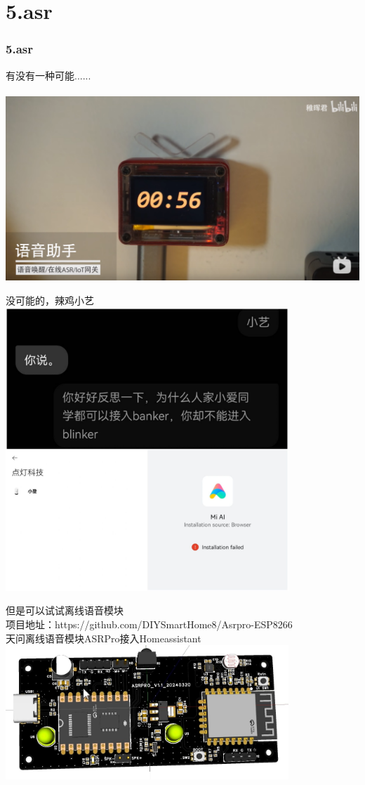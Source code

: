 \documentclass[16pt]{beamer}	%
\newcommand{\ftitle}[1]{\frametitle{#1}}	%
\begin{document}
		\section{5.asr}
		\begin{frame}
			\ftitle{5.asr}
			有没有一种可能......
			\\ \hspace*{\fill}	\\ \includegraphics [width=1.0\textwidth]{pic/5-1.png}
		\end{frame}
		\begin{frame}
		  没可能的，辣鸡小艺
		\\ \centering \includegraphics [width=0.8\textwidth]{pic/5-2.jpg}
		\end{frame}
		\begin{frame}
			但是可以试试离线语音模块
			\\项目地址：https://github.com/DIYSmartHome8/Asrpro-ESP8266
			\\天问离线语音模块ASRPro接入Homeassistant
			\\ \centering \includegraphics [width=0.8\textwidth]{pic/5-3.jpg}
		 \end{frame}
\end{document}
